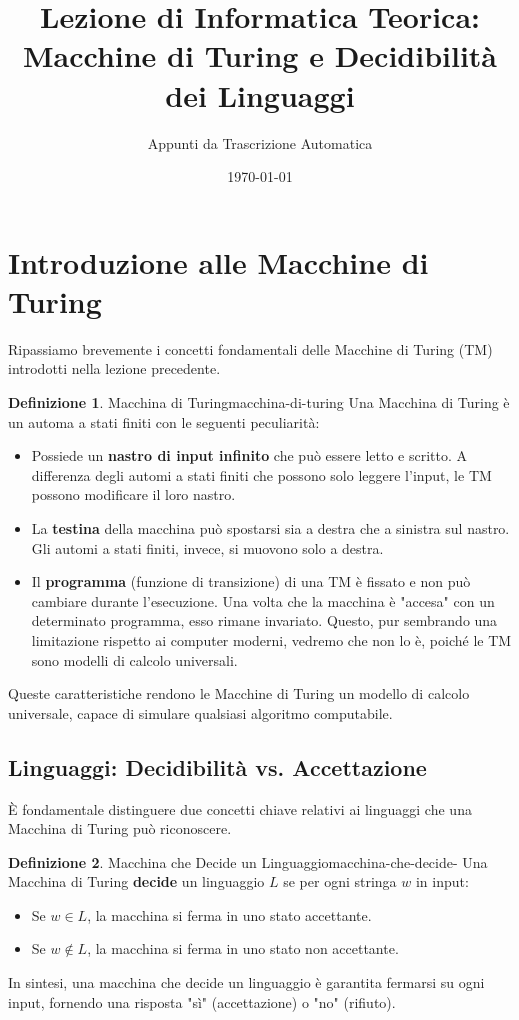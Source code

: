 \documentclass[a4paper]{article}
\title{Lezione di Informatica Teorica: Macchine di Turing e Decidibilità dei Linguaggi}
\author{Appunti da Trascrizione Automatica}
\date{\today}
\theoremstyle{definition} %
\newtheorem{definition}{Definizione}
\begin{document}
\maketitle
\tableofcontents
\newpage

\section{Introduzione alle Macchine di Turing}

Ripassiamo brevemente i concetti fondamentali delle Macchine di Turing (TM) introdotti nella lezione precedente.

\begin{definition}{Macchina di Turing}{macchina-di-turing}
Una Macchina di Turing è un automa a stati finiti con le seguenti peculiarità:
\begin{itemize}
    \item Possiede un \textbf{nastro di input infinito} che può essere letto e scritto. A differenza degli automi a stati finiti che possono solo leggere l'input, le TM possono modificare il loro nastro.
    \item La \textbf{testina} della macchina può spostarsi sia a destra che a sinistra sul nastro. Gli automi a stati finiti, invece, si muovono solo a destra.
    \item Il \textbf{programma} (funzione di transizione) di una TM è fissato e non può cambiare durante l'esecuzione. Una volta che la macchina è "accesa" con un determinato programma, esso rimane invariato. Questo, pur sembrando una limitazione rispetto ai computer moderni, vedremo che non lo è, poiché le TM sono modelli di calcolo universali.
\end{itemize}
Queste caratteristiche rendono le Macchine di Turing un modello di calcolo universale, capace di simulare qualsiasi algoritmo computabile.
\end{definition}

\subsection{Linguaggi: Decidibilità vs. Accettazione}

È fondamentale distinguere due concetti chiave relativi ai linguaggi che una Macchina di Turing può riconoscere.

\begin{definition}{Macchina che Decide un Linguaggio}{macchina-che-decide-}
Una Macchina di Turing \textbf{decide} un linguaggio $L$ se per ogni stringa $w$ in input:
\begin{itemize}
    \item Se $w \in L$, la macchina si ferma in uno stato accettante.
    \item Se $w \notin L$, la macchina si ferma in uno stato non accettante.
\end{itemize}
In sintesi, una macchina che decide un linguaggio è garantita fermarsi su ogni input, fornendo una risposta "sì" (accettazione) o "no" (rifiuto).
\end{definition}
\end{document}
